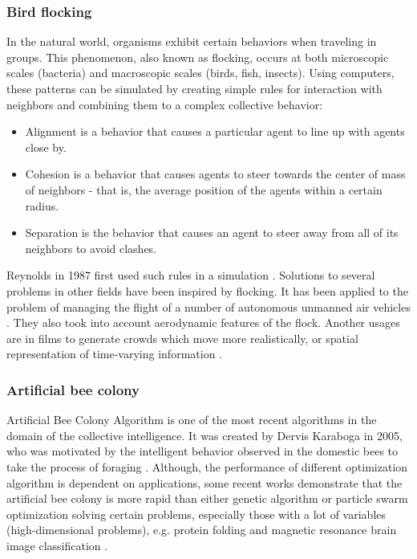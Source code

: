
\subsubsection{Bird flocking} %
\label{ssub:bird_flocking}

In the natural world, organisms exhibit certain behaviors when traveling in groups. This phenomenon, also known as flocking, occurs at both microscopic scales (bacteria) and macroscopic scales (birds, fish, insects). Using computers, these patterns can be simulated by creating simple rules for interaction with neighbors and combining them to a complex collective behavior:
\begin{itemize}
  \item Alignment is a behavior that causes a particular agent to line up with agents close by.
  \item Cohesion is a behavior that causes agents to steer towards the center of mass of neighbors - that is, the average position of the agents within a certain radius.
  \item Separation is the behavior that causes an agent to steer away from all of its neighbors to avoid clashes.
\end{itemize}
Reynolds in 1987 first used such rules in a simulation \cite{Reynolds87Flocks}.
Solutions to several problems in other fields have been inspired by flocking. It has been applied to the problem of managing the flight of a number of autonomous unmanned air vehicles \cite{Crowther03FlockingAirVehicles}. They also took into account aerodynamic features of the flock. Another usages are in films to generate crowds which move more realistically, or spatial representation of time-varying information \cite{Moere04FlockingVisual}.


\subsubsection{Artificial bee colony} %
\label{ssub:artificial_bee_colony}

Artificial Bee Colony Algorithm is one of the most recent algorithms in the domain of the collective intelligence. It was created by Dervis Karaboga in 2005, who was motivated by the intelligent behavior observed in the domestic bees to take the process of foraging \cite{Karaboga07Bees}. Although, the performance of different optimization algorithm is dependent on applications, some recent works demonstrate that the artificial bee colony is more rapid than either genetic algorithm or particle swarm optimization solving certain problems, especially those with a lot of variables (high-dimensional problems), e.g. protein folding \cite{Li14BeesProtein} and magnetic resonance brain image classification \cite{Zhang11BeesMagnetic}.

